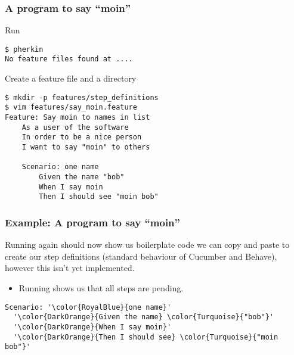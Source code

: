 \documentclass[10pt]{vcs_beamer}
\begin{document}
\begin{frame}[fragile]
\frametitle{A program to say ``moin''}

Run 
\begin{lstlisting}
$ pherkin
No feature files found at ....
\end{lstlisting}

Create a feature file and a  directory
\begin{lstlisting}
$ mkdir -p features/step_definitions
$ vim features/say_moin.feature
Feature: Say moin to names in list
    As a user of the software
    In order to be a nice person
    I want to say "moin" to others

    Scenario: one name
        Given the name "bob"
        When I say moin
        Then I should see "moin bob"
\end{lstlisting}

\end{frame}

\begin{frame}[fragile]
\frametitle{Example: A program to say ``moin''}

Running  again should now show us boilerplate code we can copy
and paste to create our step definitions (standard behaviour of Cucumber and
Behave), however this isn't yet implemented.

\begin{itemize}
    \item Running  shows us that all steps are pending.
\end{itemize}

\begin{lstlisting}[escapeinside='']
Scenario: '\color{RoyalBlue}{one name}'
  '\color{DarkOrange}{Given the name} \color{Turquoise}{"bob"}'
  '\color{DarkOrange}{When I say moin}'
  '\color{DarkOrange}{Then I should see} \color{Turquoise}{"moin bob"}'
\end{lstlisting}

\end{frame}
\end{document}
